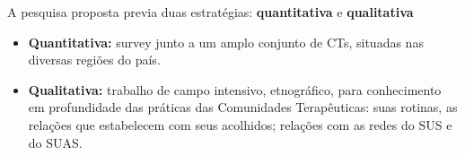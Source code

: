 
A pesquisa proposta previa duas estratégias: {\bf quantitativa} e {\bf qualitativa}

\begin{block}{}

\begin{itemize}
	\item {\bf Quantitativa:} survey junto a um amplo conjunto de CTs, situadas nas diversas regiões do país.
	\item {\bf Qualitativa:} trabalho de campo intensivo, etnográfico, para conhecimento em profundidade das práticas das Comunidades Terapêuticas: suas rotinas, as relações que estabelecem com seus acolhidos; relações com as redes do SUS e do SUAS.
\end{itemize}

\end{block}{}
